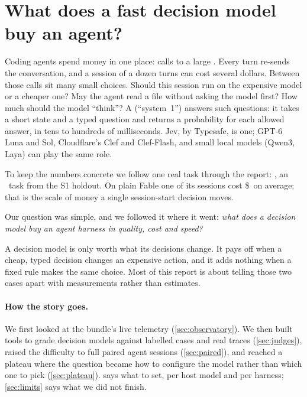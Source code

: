 \section{What does a fast decision model buy an agent?}\label{sec:intro}

Coding agents spend money in one place: calls to a large . Every turn re-sends the conversation, and
a session of a dozen turns can cost several dollars. Between those calls sit many small choices. Should this session
run on the expensive model or a cheaper one? May the agent read a file without asking the model first? How much
should the model ``think''? A  (``system~1'') answers such questions: it takes a short state
and a typed question and returns a probability for each allowed answer, in tens to hundreds of milliseconds. Jev,
by Typesafe, is one; GPT-6 Luna and Sol, Cloudflare's Clef and Clef-Flash, and small local models (Qwen3, Laya) can
play the same role.

To keep the numbers concrete we follow one real task through the report: \code{\WxScen}, an \WxTaskType\ task from
the S1 holdout. On plain Fable one of its sessions cost \$\WxPlain\ on average; that is the scale of money a single
session-start decision moves.

Our question was simple, and we followed it where it went: \emph{what does a decision model buy an agent harness in
quality, cost and speed?}

\begin{keyidea}
A decision model is only worth what its decisions change. It pays off when a cheap, typed decision changes an
expensive action, and it adds nothing when a fixed rule makes the same choice. Most of this report is about telling
those two cases apart with measurements rather than estimates.
\end{keyidea}

\paragraph{How the story goes.} We first looked at the bundle's live telemetry (\cref{sec:observatory}). We then built
tools to grade decision models against labelled cases and real traces (\cref{sec:judges}), raised the difficulty to
full paired agent sessions (\cref{sec:paired}), and reached a plateau where the question became how to configure the
model rather than which one to pick (\cref{sec:plateau}).  says what to set, per host model and
per harness; \cref{sec:limits} says what we did not finish.

